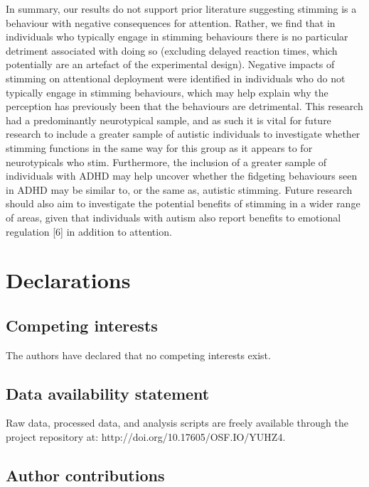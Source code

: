 \documentclass[
  letterpaper,
  DIV=11,
  numbers=noendperiod]{scrartcl}
\begin{document}
In summary, our results do not support prior literature suggesting
stimming is a behaviour with negative consequences for attention.
Rather, we find that in individuals who typically engage in stimming
behaviours there is no particular detriment associated with doing so
(excluding delayed reaction times, which potentially are an artefact of
the experimental design). Negative impacts of stimming on attentional
deployment were identified in individuals who do not typically engage in
stimming behaviours, which may help explain why the perception has
previously been that the behaviours are detrimental. This research had a
predominantly neurotypical sample, and as such it is vital for future
research to include a greater sample of autistic individuals to
investigate whether stimming functions in the same way for this group as
it appears to for neurotypicals who stim. Furthermore, the inclusion of
a greater sample of individuals with ADHD may help uncover whether the
fidgeting behaviours seen in ADHD may be similar to, or the same as,
autistic stimming. Future research should also aim to investigate the
potential benefits of stimming in a wider range of areas, given that
individuals with autism also report benefits to emotional regulation
{[}6{]} in addition to attention.

\section{Declarations}\label{declarations}

\subsection{Competing interests}\label{competing-interests}

The authors have declared that no competing interests exist.

\subsection{Data availability
statement}\label{data-availability-statement}

Raw data, processed data, and analysis scripts are freely available
through the project repository at: http://doi.org/10.17605/OSF.IO/YUHZ4.

\subsection{Author contributions}\label{author-contributions}
\end{document}
